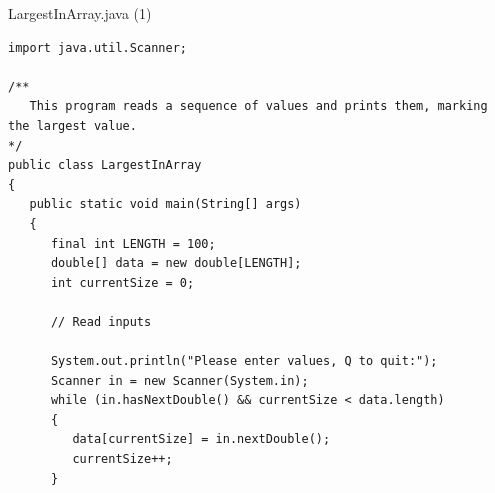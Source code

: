 \documentclass[aspectratio=43,10pt,t]{beamer}
\newcommand{\callout}[2][\linewidth]{%
  {\setlength{\fboxsep}{3pt}\colorbox{callout}{%
    \parbox{\dimexpr#1-6pt\relax}{\raggedright\footnotesize #2}}}}
\begin{document}
\begin{frame}[fragile]{LargestInArray.java (1)}
\begin{lstlisting}[style=program]
import java.util.Scanner;

/**
   This program reads a sequence of values and prints them, marking the largest value.
*/
public class LargestInArray
{
   public static void main(String[] args)
   {
      final int LENGTH = 100;
      double[] data = new double[LENGTH];
      int currentSize = 0;

      // Read inputs

      System.out.println("Please enter values, Q to quit:");
      Scanner in = new Scanner(System.in);
      while (in.hasNextDouble() && currentSize < data.length)
      {
         data[currentSize] = in.nextDouble();
         currentSize++;
      }
\end{lstlisting}
\end{frame}
\end{document}
